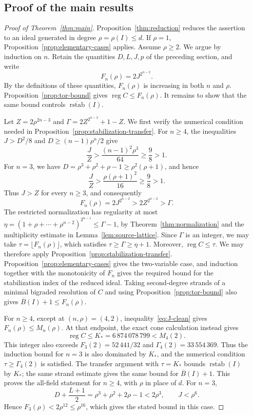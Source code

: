 \documentclass[12pt]{amsart}
\numberwithin{equation}{section}
\theoremstyle{definition}
\theoremstyle{remark}
\numberwithin{equation}{section}
\DeclareMathOperator{\reg}{reg}
\newcommand{\Bn}{\overline B}
\newcommand{\rstabn}{\overline{\operatorname{rstab}}}
\begin{document}
\subsection{Proof of the main results}
\begin{proof}[Proof of Theorem~\ref{thm:main}]
	Proposition~\ref{thm:reduction} reduces the assertion to an ideal generated in degree $\rho=\rho(I)\le d$. If $\rho=1$,
	Proposition~\ref{prop:elementary-cases} applies. Assume $\rho\ge2$. We argue by induction on $n$. Retain the quantities $D,L,J,p$
	of the preceding section, and write
	\[
	F_n(\rho)=2J^{2^{n-2}}.
	\]
	By the definitions of these quantities, $F_n(\rho)$ is increasing in both $n$ and $\rho$. Proposition~\ref{prop:tor-bound} gives $\reg C\le F_n(\rho)$.
	It remains to show that the same bound controls $\rstabn(I)$.
	
	Let $Z=2\rho^{2n-3}$ and $\Gamma=2Z^{2^{n-2}}+1-Z$. We first verify the numerical condition needed in Proposition~\ref{prop:stabilization-transfer}. For $n\ge4$, the inequalities $J>D^2/8$ and $D\ge(n-1)\rho^n/2$ give
	\[
	\frac JZ>\frac{(n-1)^2\rho^3}{64}\ge\frac98>1.
	\]
	For $n=3$, we have $D=\rho^3+\rho^2+\rho-1\ge\rho^2(\rho+1)$, and hence
	\[
	\frac JZ>\frac{\rho(\rho+1)^2}{16}\ge\frac98>1.
	\]
	Thus $J>Z$ for every $n\ge3$, and consequently
	\[
	F_n(\rho)=2J^{2^{n-2}}
	>2Z^{2^{n-2}}
	>\Gamma.
	\]
The restricted normalization has regularity at most $\eta=(1+\rho+\cdots+\rho^{n-2})^{2^{n-1}}\le\Gamma-1$, by Theorem~\ref{thm:normalization} and the multiplicity estimate in Lemma~\ref{lem:source-lattice}. Since $\Gamma$ is an integer, we may take
$\tau=\lfloor F_n(\rho)\rfloor$, which satisfies $\tau\ge\Gamma\ge\eta+1$. Moreover,
$\reg C\le\tau$. We may therefore apply Proposition~\ref{prop:stabilization-transfer}. Proposition~\ref{prop:elementary-cases} gives the two-variable case, and induction together with the monotonicity of $F_n$ gives the required bound
for the stabilization index of the reduced ideal. Taking second-degree strands of a minimal bigraded resolution of $C$ and using Proposition~\ref{prop:tor-bound} also gives $\Bn(I)+1\le F_n(\rho)$.

	
	For $n\ge4$, except at $(n,\rho)=(4,2)$, inequality~\eqref{eq:J-clean}
	gives $F_n(\rho)\le M_n(\rho)$. At that endpoint, the exact cone calculation instead gives
	\[
	\reg C\le K_*=6\,874\,078\,799<M_4(2).
	\]
	This integer also exceeds $F_3(2)=52\,441/32$ and $\Gamma_4(2)=33\,554\,369$. Thus the induction bound for $n=3$ is also dominated by $K_*$, and the numerical condition $\tau\ge\Gamma_4(2)$ is satisfied.
	The transfer argument with $\tau=K_*$ bounds $\rstabn(I)$ by $K_*$;  the same strand estimate gives the same bound for $\Bn(I)+1$.
	This proves the all-field statement for $n\ge4$, with $\rho$ in place of $d$. For $n=3$,
	\[
	D+\frac{L+1}{2}=\rho^3+\rho^2+2\rho-1<2\rho^3,
	\qquad J<\rho^6.
	\]
	Hence $F_3(\rho)<2\rho^{12}\le\rho^{16}$, which gives the stated bound in this case.
	

\end{proof}
\end{document}
